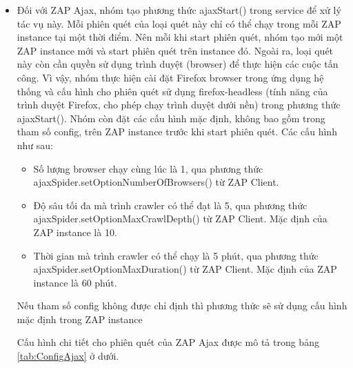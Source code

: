 \begin{itemize}
  \item Đối với ZAP Ajax, nhóm tạo phương thức ajaxStart() trong service để xử lý tác vụ này. Mỗi phiên quét của loại quét này chỉ có thể chạy trong mỗi ZAP instance tại một thời điểm. Nên mỗi khi start phiên quét, nhóm tạo mới một ZAP instance mới và start phiên quét trên instance đó. Ngoài ra, loại quét này còn cần quyền sử dụng trình duyệt (browser) để thực hiện các cuộc tấn công. Vì vậy, nhóm thực hiện cài đặt Firefox browser trong ứng dụng hệ thống và cấu hình cho phiên quét sử dụng firefox-headless (tính năng của trình duyệt Firefox, cho phép chạy trình duyệt dưới nền) trong phương thức ajaxStart(). Nhóm còn đặt các cấu hình mặc định, không bao gồm trong tham số config, trên ZAP instance trước khi start phiên quét. Các cấu hình như sau:
        \begin{itemize}
          \item Số lượng browser chạy cùng lúc là 1, qua phương thức \\
                ajaxSpider.setOptionNumberOfBrowsers() từ ZAP Client.
          \item Độ sâu tối đa mà trình crawler có thể đạt là 5, qua phương thức \\
                ajaxSpider.setOptionMaxCrawlDepth() từ ZAP Client. Mặc định của ZAP instance là 10.
          \item Thời gian mà trình crawler có thể chạy là 5 phút, qua phương thức \\
                ajaxSpider.setOptionMaxDuration() từ ZAP Client. Mặc định của ZAP instance là 60 phút.
        \end{itemize}
        Nếu tham số config không được chỉ định thì phương thức sẽ sử dụng cấu hình mặc định trong ZAP instance

        Cấu hình chi tiết cho phiên quét của ZAP Ajax được mô tả trong bảng \ref{tab:ConfigAjax} ở dưới.


\end{itemize}

